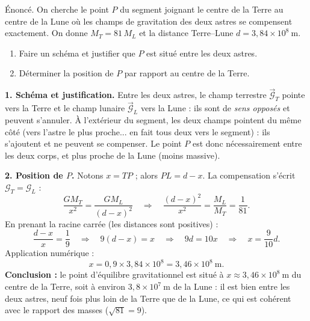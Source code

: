 \documentclass[11pt]{article}
\newcommand{\legende}[1]{\par\vspace{6pt}{\popsemi\fontsize{9}{11.5}\selectfont\color{popmuted}#1}}
\begin{document}
\begin{exoresolu}
Énoncé. On cherche le point $P$ du segment joignant le centre de la Terre au centre de la Lune où les champs de gravitation des deux astres se compensent exactement. On donne $M_T = 81\,M_L$ et la distance Terre--Lune $d = 3{,}84\times 10^{8}\ \mathrm{m}$.
\begin{enumerate}
\item Faire un schéma et justifier que $P$ est situé entre les deux astres.
\item Déterminer la position de $P$ par rapport au centre de la Terre.
\end{enumerate}
\tcblower
\textbf{1. Schéma et justification.} Entre les deux astres, le champ terrestre $\vec{\mathcal{G}}_T$ pointe vers la Terre et le champ lunaire $\vec{\mathcal{G}}_L$ vers la Lune : ils sont de \emph{sens opposés} et peuvent s'annuler. À l'extérieur du segment, les deux champs pointent du même côté (vers l'astre le plus proche... en fait tous deux vers le segment) : ils s'ajoutent et ne peuvent se compenser. Le point $P$ est donc nécessairement entre les deux corps, et plus proche de la Lune (moins massive).
\begin{popfigure}
\legende{Point d'équilibre gravitationnel Terre--Lune.}
\end{popfigure}
\textbf{2. Position de $P$.} Notons $x = TP$ ; alors $PL = d - x$. La compensation s'écrit $\mathcal{G}_T = \mathcal{G}_L$ :
\[ \dfrac{GM_T}{x^2} = \dfrac{GM_L}{(d-x)^2} \quad\Longrightarrow\quad \dfrac{(d-x)^2}{x^2} = \dfrac{M_L}{M_T} = \dfrac{1}{81}. \]
En prenant la racine carrée (les distances sont positives) :
\[ \dfrac{d-x}{x} = \dfrac{1}{9} \quad\Longrightarrow\quad 9(d-x) = x \quad\Longrightarrow\quad 9d = 10x \quad\Longrightarrow\quad x = \dfrac{9}{10}d. \]
Application numérique :
\[ x = 0{,}9\times 3{,}84\times 10^{8} = 3{,}46\times 10^{8}\ \mathrm{m}. \]
\textbf{Conclusion :} le point d'équilibre gravitationnel est situé à $x \approx 3{,}46\times 10^{8}\ \mathrm{m}$ du centre de la Terre, soit à environ $3{,}8\times 10^{7}\ \mathrm{m}$ de la Lune : il est bien entre les deux astres, neuf fois plus loin de la Terre que de la Lune, ce qui est cohérent avec le rapport des masses ($\sqrt{81} = 9$).
\end{exoresolu}
\end{document}
